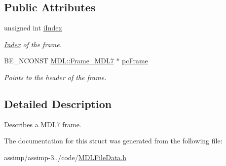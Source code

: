 \subsection*{Public Attributes}
\begin{DoxyCompactItemize}
\item 
\hypertarget{struct_assimp_1_1_m_d_l_1_1_int_frame_info___m_d_l7_adc05ba526895fa95fdc97dcef4d76d62}{unsigned int \hyperlink{struct_assimp_1_1_m_d_l_1_1_int_frame_info___m_d_l7_adc05ba526895fa95fdc97dcef4d76d62}{i\+Index}}\label{struct_assimp_1_1_m_d_l_1_1_int_frame_info___m_d_l7_adc05ba526895fa95fdc97dcef4d76d62}

\begin{DoxyCompactList}\small\item\em \hyperlink{struct_index}{Index} of the frame. \end{DoxyCompactList}\item 
\hypertarget{struct_assimp_1_1_m_d_l_1_1_int_frame_info___m_d_l7_afecd3770769fb5eb4c59b6abd34e8bfa}{B\+E\+\_\+\+N\+C\+O\+N\+S\+T \hyperlink{struct_assimp_1_1_m_d_l_1_1_frame___m_d_l7}{M\+D\+L\+::\+Frame\+\_\+\+M\+D\+L7} $\ast$ \hyperlink{struct_assimp_1_1_m_d_l_1_1_int_frame_info___m_d_l7_afecd3770769fb5eb4c59b6abd34e8bfa}{pc\+Frame}}\label{struct_assimp_1_1_m_d_l_1_1_int_frame_info___m_d_l7_afecd3770769fb5eb4c59b6abd34e8bfa}

\begin{DoxyCompactList}\small\item\em Points to the header of the frame. \end{DoxyCompactList}\end{DoxyCompactItemize}


\subsection{Detailed Description}
Describes a M\+D\+L7 frame. 

The documentation for this struct was generated from the following file\+:\begin{DoxyCompactItemize}
\item 
assimp/assimp-\/3../code/\hyperlink{_m_d_l_file_data_8h}{M\+D\+L\+File\+Data.\+h}\end{DoxyCompactItemize}
